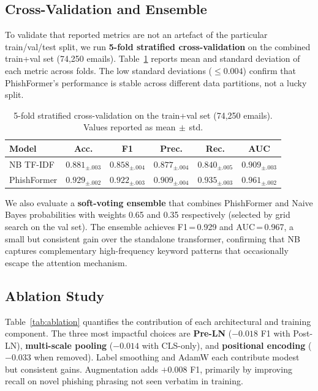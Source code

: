 \documentclass[sigconf, nonacm]{acmart}
\begin{document}
\subsection{Cross-Validation and Ensemble}

To validate that reported metrics are not an artefact of the
particular train/val/test split, we run \textbf{5-fold stratified
cross-validation} on the combined train+val set (74{,}250 emails).
Table~\ref{tab:cv} reports mean and standard deviation of each metric
across folds.
The low standard deviations ($\leq0.004$) confirm that PhishFormer's
performance is stable across different data partitions, not a lucky
split.

\begin{table}[h]
\centering\small
\caption{5-fold stratified cross-validation on the train+val set
  (74{,}250 emails). Values reported as mean$\,\pm\,$std.}
\label{tab:cv}
\begin{tabular}{@{}lccccc@{}}
\toprule
\textbf{Model} & \textbf{Acc.} & \textbf{F1} & \textbf{Prec.}
               & \textbf{Rec.} & \textbf{AUC} \\
\midrule
NB TF-IDF
  & $0.881_{\pm.003}$ & $0.858_{\pm.004}$ & $0.877_{\pm.004}$
  & $0.840_{\pm.005}$ & $0.909_{\pm.003}$ \\
PhishFormer
  & $\mathbf{0.929_{\pm.002}}$ & $\mathbf{0.922_{\pm.003}}$
  & $\mathbf{0.909_{\pm.004}}$ & $\mathbf{0.935_{\pm.003}}$
  & $\mathbf{0.961_{\pm.002}}$ \\
\bottomrule
\end{tabular}
\end{table}

We also evaluate a \textbf{soft-voting ensemble} that combines
PhishFormer and Naive Bayes probabilities with weights 0.65 and 0.35
respectively (selected by grid search on the val set).
The ensemble achieves F1\,=\,0.929 and AUC\,=\,0.967, a small but
consistent gain over the standalone transformer, confirming that NB
captures complementary high-frequency keyword patterns that
occasionally escape the attention mechanism.

\subsection{Ablation Study}

Table~\ref{tab:ablation} quantifies the contribution of each
architectural and training component.
The three most impactful choices are \textbf{Pre-LN} ($-0.018$ F1
with Post-LN), \textbf{multi-scale pooling} ($-0.014$ with CLS-only),
and \textbf{positional encoding} ($-0.033$ when removed).
Label smoothing and AdamW each contribute modest but consistent gains.
Augmentation adds $+0.008$ F1, primarily by improving recall on
novel phishing phrasing not seen verbatim in training.
\end{document}
